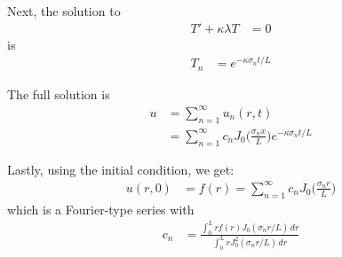 Next, the solution to
%
\begin{align*}
T' + \kappa \lambda T & = 0
\end{align*}
is
\begin{align*}
T_n & = e^{-\kappa \sigma_n t/L}
\end{align*}

The full solution is
%
\begin{align*}
u & = \sum_{n=1}^{\infty} u_n(r,t) \\
& = \sum_{n=1}^{\infty} c_n J_0\biggl(\frac{\sigma_n x}{L} \biggr) e^{-\kappa \sigma_n t/L}
\end{align*}

Lastly, using the initial condition, we get:
%
\begin{align*}
u(r,0) & = f(r) =\sum_{n=1}^{\infty} c_n J_0\biggl(\frac{\sigma_n r}{L} \biggr)
\end{align*}
which is a Fourier-type series with
%
\begin{align*}
c_n & = \frac{\int_0^L r f(r) J_0(\sigma_n r/L) \, dr}{\int_0^{L} r J_0^2(\sigma_n r/L) \, dr}
\end{align*}

